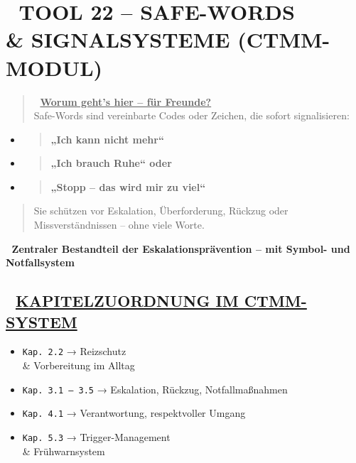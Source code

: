 \hypertarget{tool-22-safe-words-signalsysteme-ctmm-modul}{%
\section{\texorpdfstring{\textbf{🛑 TOOL 22 -- SAFE-WORDS \\\& SIGNALSYSTEME (CTMM-MODUL)}}{🛑 TOOL 22 -- SAFE-WORDS \\\& SIGNALSYSTEME (CTMM-MODUL)}}\label{tool-22-safe-words-signalsysteme-ctmm-modul}}

\begin{quote}
🧠 \textbf{\ul{Worum geht's hier -- für Freunde?}\\}
Safe-Words sind vereinbarte Codes oder Zeichen, die sofort signalisieren:
\end{quote}

\begin{itemize}
\item
  \begin{quote}
  \textbf{„Ich kann nicht mehr``}
  \end{quote}
\item
  \begin{quote}
  \textbf{„Ich brauch Ruhe`` oder}
  \end{quote}
\item
  \begin{quote}
  \textbf{„Stopp -- das wird mir zu viel``}
  \end{quote}
\end{itemize}

\begin{quote}
Sie schützen vor Eskalation, Überforderung, Rückzug oder Missverständnissen -- ohne viele Worte.
\end{quote}

🧩 \textbf{Zentraler Bestandteil der Eskalationsprävention -- mit Symbol- und Notfallsystem}

\hypertarget{kapitelzuordnung-im-ctmm-system}{%
\subsection{\texorpdfstring{📘 \textbf{\ul{KAPITELZUORDNUNG IM CTMM-SYSTEM}}}{📘 KAPITELZUORDNUNG IM CTMM-SYSTEM}}\label{kapitelzuordnung-im-ctmm-system}}

\begin{itemize}
\tightlist
\item
  \texttt{Kap.\ }\texttt{2.2} → Reizschutz \\\& Vorbereitung im Alltag
\item
  \texttt{Kap.\ }\texttt{3.1\ –\ 3.5} → Eskalation, Rückzug, Notfallmaßnahmen
\item
  \texttt{Kap.\ }\texttt{4.1} → Verantwortung, respektvoller Umgang
\item
  \texttt{Kap.\ }\texttt{5.3} → Trigger-Management \\\& Frühwarnsystem
\end{itemize}

